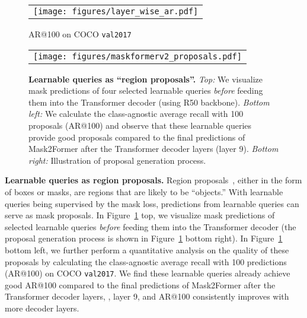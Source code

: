 \documentclass[10pt,twocolumn,letterpaper]{article}
\newcommand{\tablestyle}[2]{\setlength{\tabcolsep}{#1}\renewcommand{\arraystretch}{#2}\centering\footnotesize}
\newcommand{\modelname}{Mask2Former\xspace}
\newcommand{\figref}[1]{Figure~\ref{#1}}
\begin{document}
\begin{figure}[t]
\begin{subtable}{0.48\linewidth}
\begin{tabular}{c}
       \texttt{[image: figures/layer\_wise\_ar.pdf]} \\
      \end{tabular}
      \caption*{AR@100 on COCO \texttt{val2017}}
    \end{subtable}
    \begin{subtable}{0.48\linewidth}
      \centering
      \tablestyle{3pt}{1.2}
      \scriptsize
      \begin{tabular}{c}
       \texttt{[image: figures/maskformerv2\_proposals.pdf]} \\
      \end{tabular}
    \end{subtable}
  \vspace{-2mm}
  \caption{
  \textbf{Learnable queries as ``region proposals''.} \emph{Top:} We visualize mask predictions of four selected learnable queries \emph{before} feeding them into the Transformer decoder (using R50 backbone).
  \emph{Bottom left:} We calculate the class-agnostic average recall with 100 proposals (AR@100) and observe that these learnable queries provide good proposals compared to the final predictions of \modelname after the Transformer decoder layers (layer 9).
  \emph{Bottom right:} Illustration of proposal generation process.
  }
  \label{fig:analysis:query}
\end{figure}




\noindent\textbf{Learnable queries as region proposals.} Region proposals~\cite{uijlings2013selective,arbelaez2014multiscale}, either in the form of boxes or masks, are regions that are likely to be ``objects.'' With learnable queries being supervised by the mask loss, predictions from learnable queries can serve as mask proposals. In \figref{fig:analysis:query} top, we visualize mask predictions of selected learnable queries \emph{before} feeding them into the Transformer decoder (the proposal generation process is shown in \figref{fig:analysis:query} bottom right). In \figref{fig:analysis:query} bottom left, we further perform a quantitative analysis on the quality of these proposals by calculating the class-agnostic average recall with 100 predictions (AR@100) on COCO \texttt{val2017}. We find these learnable queries already achieve good AR@100 compared to the final predictions of \modelname after the Transformer decoder layers, \ie, layer 9, and AR@100 consistently improves with more decoder layers.
\end{document}

